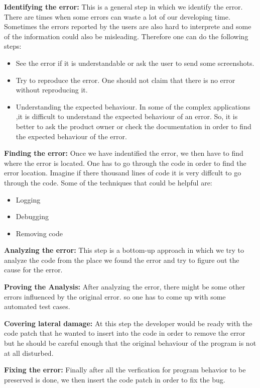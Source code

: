 \textbf{Identifying the error:} This is a general step in which we
identify the error. There are times when some errors can waste a lot
of our developing time. Sometimes the errors reported by the users are also
hard to interprete and some of the information could also be misleading.
Therefore one can do the following steps:
\begin{itemize}
 \item See the error if it is understandable or ask the user to send some screenshots.
 \item Try to reproduce the error. One should not claim that there is no error
 without reproducing it.
 \item Understanding the expected behaviour. In some of the complex applications
 ,it is difficult to understand the expected behaviour of an error. So, it is better
  to ask the product owner or check the documentation in order to find the
  expected behaviour of the error.
  \end{itemize}
  
  
\textbf{Finding the error:} Once we have indentified the error, we then have to 
find where the error is located. One has to go through the code in order to find
the error location. Imagine if there thousand lines of code it is very diffcult
to go through the code. Some of the techniques that could be helpful are:
\begin{itemize}
 \item Logging
 \item Debugging
 \item Removing code
\end{itemize}


\textbf{Analyzing the error:} This step is a bottom-up approach in which
we try to analyze the code from the place we found the error and try to figure 
out the cause for the error.

\textbf{Proving the Analysis:} After analyzing the error, there
might be some other errors influenced by the original error. so 
one has to come up with some automated test cases.


\textbf{Covering lateral damage:} At this step the developer
would be ready with the code patch that he wanted to insert
into the code in order to remove the error but he should
be careful enough that the original behaviour of the program
is not at all disturbed.


\textbf{Fixing the error:} Finally after all the verfication
for program behavior to be preserved is done, we then
insert the code patch in order to fix the bug.


